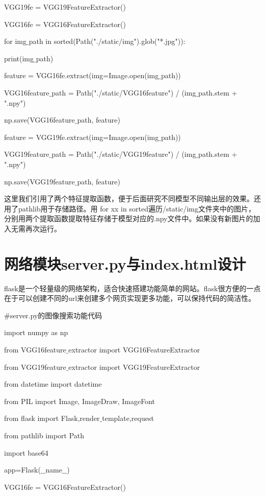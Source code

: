 \documentclass[bachelor_p]{hdu-thesis}
\begin{document}
\qquad VGG19fe = VGG19FeatureExtractor()

\qquad VGG16fe = VGG16FeatureExtractor()
    
\qquad for img$\_$path in sorted(Path("./static/img").glob("*.jpg")):

\qquad \qquad print(img$\_$path)

\qquad \qquad feature = VGG16fe.extract(img=Image.open(img$\_$path))

\qquad \qquad VGG16feature$\_$path = Path("./static/VGG16feature") / (img$\_$path.stem + ".npy") 

\qquad \qquad np.save(VGG16feature$\_$path, feature)

\qquad \qquad feature = VGG19fe.extract(img=Image.open(img$\_$path))

\qquad \qquad VGG19feature$\_$path = Path("./static/VGG19feature") / (img$\_$path.stem + ".npy")  

\qquad \qquad np.save(VGG19feature$\_$path, feature)

这里我们引用了两个特征提取函数，便于后面研究不同模型不同输出层的效果。还用了pathlib用于存储路径。用 for xx in sorted遍历/static/img文件夹中的图片，分别用两个提取函数提取特征存储于模型对应的.npy文件中。如果没有新图片的加入无需再次运行。

\section {网络模块server.py与index.html设计}

flask是一个轻量级的网络架构，适合快速搭建功能简单的网站。flask很方便的一点在于可以创建不同的url来创建多个网页实现更多功能，可以保持代码的简洁性。

$\#$server.py的图像搜索功能代码

import numpy as np

from VGG16feature$\_$extractor import VGG16FeatureExtractor

from VGG19feature$\_$extractor import VGG19FeatureExtractor

from datetime import datetime

from PIL import Image, ImageDraw, ImageFont

from flask import Flask,render$\_$template,request

from pathlib import Path

import base64

app=Flask($\_$$\_$name$\_$$\_$)

VGG16fe = VGG16FeatureExtractor()
\end{document}

